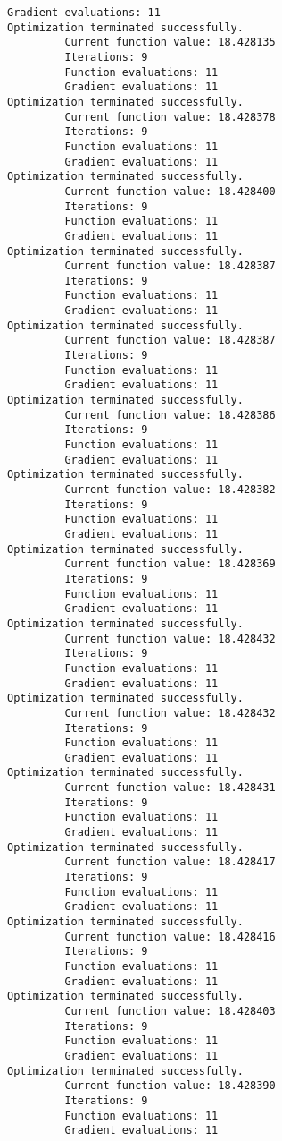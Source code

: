 \documentclass[11pt]{article}
\begin{document}
\begin{Verbatim}[commandchars=\\\{\}]
         Gradient evaluations: 11
Optimization terminated successfully.
         Current function value: 18.428135
         Iterations: 9
         Function evaluations: 11
         Gradient evaluations: 11
Optimization terminated successfully.
         Current function value: 18.428378
         Iterations: 9
         Function evaluations: 11
         Gradient evaluations: 11
Optimization terminated successfully.
         Current function value: 18.428400
         Iterations: 9
         Function evaluations: 11
         Gradient evaluations: 11
Optimization terminated successfully.
         Current function value: 18.428387
         Iterations: 9
         Function evaluations: 11
         Gradient evaluations: 11
Optimization terminated successfully.
         Current function value: 18.428387
         Iterations: 9
         Function evaluations: 11
         Gradient evaluations: 11
Optimization terminated successfully.
         Current function value: 18.428386
         Iterations: 9
         Function evaluations: 11
         Gradient evaluations: 11
Optimization terminated successfully.
         Current function value: 18.428382
         Iterations: 9
         Function evaluations: 11
         Gradient evaluations: 11
Optimization terminated successfully.
         Current function value: 18.428369
         Iterations: 9
         Function evaluations: 11
         Gradient evaluations: 11
Optimization terminated successfully.
         Current function value: 18.428432
         Iterations: 9
         Function evaluations: 11
         Gradient evaluations: 11
Optimization terminated successfully.
         Current function value: 18.428432
         Iterations: 9
         Function evaluations: 11
         Gradient evaluations: 11
Optimization terminated successfully.
         Current function value: 18.428431
         Iterations: 9
         Function evaluations: 11
         Gradient evaluations: 11
Optimization terminated successfully.
         Current function value: 18.428417
         Iterations: 9
         Function evaluations: 11
         Gradient evaluations: 11
Optimization terminated successfully.
         Current function value: 18.428416
         Iterations: 9
         Function evaluations: 11
         Gradient evaluations: 11
Optimization terminated successfully.
         Current function value: 18.428403
         Iterations: 9
         Function evaluations: 11
         Gradient evaluations: 11
Optimization terminated successfully.
         Current function value: 18.428390
         Iterations: 9
         Function evaluations: 11
         Gradient evaluations: 11

\end{Verbatim}
\end{document}
